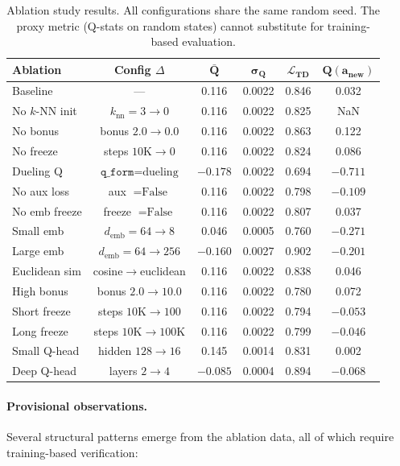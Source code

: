 \documentclass{article}
\begin{document}
\begin{table}[h]
  \centering
  \caption{Ablation study results. All configurations share the same random
  seed. The proxy metric (Q-stats on random states) cannot substitute for
  training-based evaluation.}
  \label{tab:ablations}
  \small
  \begin{tabular}{lccccc}
    \toprule
    \textbf{Ablation} & \textbf{Config $\Delta$} &
      $\mathbf{\bar{Q}}$ & $\mathbf{\sigma_Q}$ &
      $\mathbf{\mathcal{L}_\text{TD}}$ & $\mathbf{Q(a_\text{new})}$ \\
    \midrule
    Baseline & --- & 0.116 & 0.0022 & 0.846 & 0.032 \\
    No $k$-NN init & $k_\text{nn}=3 \to 0$ & 0.116 & 0.0022 & 0.825 & NaN \\
    No bonus & bonus $2.0 \to 0.0$ & 0.116 & 0.0022 & 0.863 & 0.122 \\
    No freeze & steps $10\text{K} \to 0$ & 0.116 & 0.0022 & 0.824 & 0.086 \\
    Dueling Q & $\texttt{q\_form}=\text{dueling}$ & $-0.178$ & 0.0022 & 0.694 & $-0.711$ \\
    No aux loss & aux $=\text{False}$ & 0.116 & 0.0022 & 0.798 & $-0.109$ \\
    No emb freeze & freeze $=\text{False}$ & 0.116 & 0.0022 & 0.807 & 0.037 \\
    Small emb & $d_\text{emb}=64\to 8$ & 0.046 & 0.0005 & 0.760 & $-0.271$ \\
    Large emb & $d_\text{emb}=64\to 256$ & $-0.160$ & 0.0027 & 0.902 & $-0.201$ \\
    Euclidean sim & cosine$\to$euclidean & 0.116 & 0.0022 & 0.838 & 0.046 \\
    High bonus & bonus $2.0\to 10.0$ & 0.116 & 0.0022 & 0.780 & 0.072 \\
    Short freeze & steps $10\text{K}\to 100$ & 0.116 & 0.0022 & 0.794 & $-0.053$ \\
    Long freeze & steps $10\text{K}\to 100\text{K}$ & 0.116 & 0.0022 & 0.799 & $-0.046$ \\
    Small Q-head & hidden $128\to 16$ & 0.145 & 0.0014 & 0.831 & 0.002 \\
    Deep Q-head & layers $2\to 4$ & $-0.085$ & 0.0004 & 0.894 & $-0.068$ \\
    \bottomrule
  \end{tabular}
\end{table}

\paragraph{Provisional observations.}
Several structural patterns emerge from the ablation data, all of which require
training-based verification:
\end{document}
